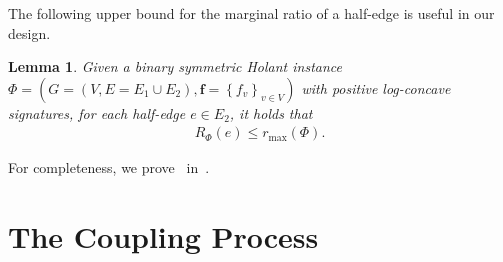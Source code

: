 \documentclass[11pt]{article}
\newtheorem{lemma}[theorem]{Lemma}
\newtheorem*{remark}{Remark}
\newcommand{\set}[1]{\left\{#1\right\}}
\newcommand{\defeq}{\triangleq} \renewcommand{\d}{\,\-d}
\newcommand{\vecf}{\boldsymbol{f}}
\newcommand{\zdtodo}[1]{\todo[color = blue!40, size = \tiny]{\textbf{zhidan:} #1}}
\newcommand{\qgl}[1]{{\color{purple}{#1}}}
\newcommand{\zdnew}[1]{{\color{cyan} #1}}
\begin{document}


The following upper bound for the marginal ratio of a half-edge is useful in our design.
\begin{lemma} \label{lem:marginal-ratio-upper-bound}
    Given a binary symmetric Holant instance $\Phi = \left(G = (V, E = E_1 \cup E_2), \vecf = \set{f_v}_{v \in V}\right)$ with positive log-concave signatures, for each half-edge $e \in E_2$, it holds that
    \begin{align*}
        R_{\Phi}(e) \le r_{\max}(\Phi).
    \end{align*}
\end{lemma}

For completeness, we prove~ in~.

\section{The Coupling Process}
\end{document}
